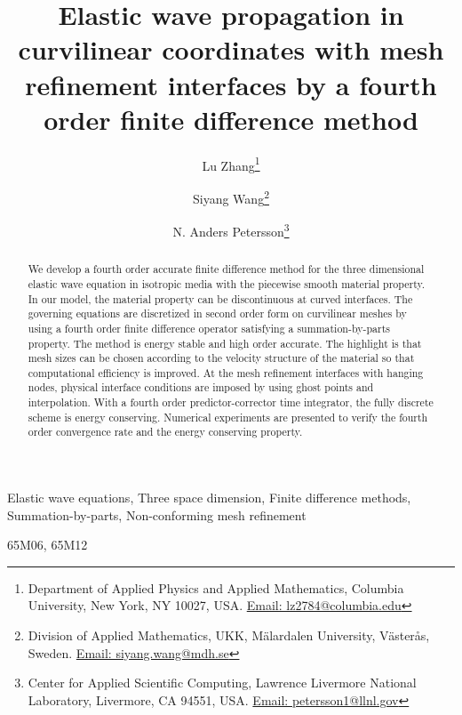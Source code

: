 \documentclass[review,onefignum,onetabnum]{siamart171218}
\title{Elastic wave propagation in curvilinear coordinates with mesh refinement interfaces by a fourth order finite difference method}
\begin{document}
\author{Lu Zhang\thanks{Department of Applied Physics and Applied Mathematics, Columbia University, New York, NY 10027, USA. \href{mailto:lz2784@columbia.edu}{Email: lz2784@columbia.edu}}\and Siyang Wang\thanks{Division of Applied Mathematics, UKK, M\"alardalen University, V\"aster\aa s, 
    Sweden. \href{mailto:siyang.wang@mdh.se}{Email: siyang.wang@mdh.se}}\and N. Anders
  Petersson\thanks{Center for Applied Scientific Computing, Lawrence Livermore National Laboratory,
    Livermore, CA 94551, USA. \href{mailto:petersson1@llnl.gov}{Email: petersson1@llnl.gov}}}
\maketitle


\begin{abstract}
We develop a fourth order accurate finite difference method for the three dimensional elastic wave equation in isotropic media with the piecewise smooth material property. In our model, the material property can be discontinuous at curved interfaces. The governing equations are discretized in second order form on curvilinear meshes by using a fourth order finite difference operator satisfying a summation-by-parts property. The method is energy stable and high order accurate. The highlight is that mesh sizes can be chosen according to the velocity structure of the material so that computational efficiency is improved. At the mesh refinement interfaces with hanging nodes, physical interface conditions are imposed by using ghost points and interpolation.  With a fourth order predictor-corrector time integrator, the fully discrete scheme is energy conserving. Numerical experiments are presented to verify the fourth order convergence rate and the energy conserving property. 
\end{abstract}

\begin{keywords}
Elastic wave equations, Three space dimension,  Finite difference methods, Summation-by-parts, Non-conforming mesh refinement
\end{keywords}

\begin{AMS}
  65M06, 65M12
\end{AMS}








\end{document}

